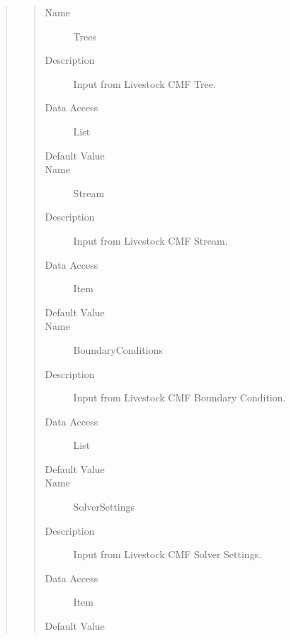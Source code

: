 \documentclass[letterpaper,10pt,english]{sphinxmanual}
\begin{document}
\begin{quote}
\begin{description}
\begin{quote}
\begin{description}
\item[{Name}] \leavevmode
Trees

\item[{Description}] \leavevmode
Input from Livestock CMF Tree.

\item[{Data Access}] \leavevmode
List

\item[{Default Value}] \leavevmode
{}

\item[{Name}] \leavevmode
Stream

\item[{Description}] \leavevmode
Input from Livestock CMF Stream. 

\item[{Data Access}] \leavevmode
Item

\item[{Default Value}] \leavevmode
{}

\item[{Name}] \leavevmode
BoundaryConditions

\item[{Description}] \leavevmode
Input from Livestock CMF Boundary Condition.

\item[{Data Access}] \leavevmode
List

\item[{Default Value}] \leavevmode
{}

\item[{Name}] \leavevmode
SolverSettings

\item[{Description}] \leavevmode
Input from Livestock CMF Solver Settings.

\item[{Data Access}] \leavevmode
Item

\item[{Default Value}] \leavevmode
{}


\end{description}
\end{quote}
\end{description}
\end{quote}
\end{document}
